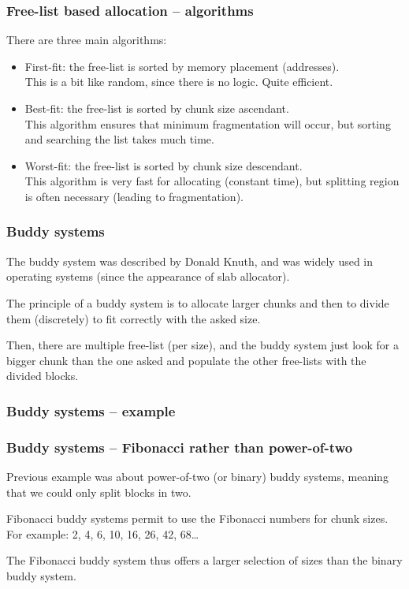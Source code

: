 \begin{frame}
  \frametitle{Free-list based allocation -- algorithms}

  There are three main algorithms:

  \begin{itemize}
  \item
    First-fit: the free-list is sorted by memory placement (addresses).\\
    This is a bit like random, since there is no logic. Quite efficient.
  \item
    Best-fit: the free-list is sorted by chunk size ascendant.\\
    This algorithm ensures that minimum fragmentation will occur, but
    sorting and searching the list takes much time.
  \item
    Worst-fit: the free-list is sorted by chunk size descendant.\\
    This algorithm is very fast for allocating (constant time), but
    splitting region is often necessary (leading to fragmentation).
  \end{itemize}

\end{frame}

\begin{frame}
  \frametitle{Buddy systems}

  The buddy system was described by Donald Knuth, and was widely used
  in operating systems (since the appearance of slab allocator).

  \-

  The principle of a buddy system is to allocate larger chunks and
  then to divide them (discretely) to fit correctly with the asked size.

  \-

  Then, there are multiple free-list (per size), and the buddy system
  just look for a bigger chunk than the one asked and populate the
  other free-lists with the divided blocks.

\end{frame}

\begin{frame}
  \frametitle{Buddy systems -- example}

  \begin{center}
  \end{center}

\end{frame}

\begin{frame}
  \frametitle{Buddy systems -- Fibonacci rather than power-of-two}

  Previous example was about power-of-two (or binary) buddy systems,
  meaning that we could only split blocks in two.

  \-

  Fibonacci buddy systems permit to use the Fibonacci numbers for
  chunk sizes. For example: 2, 4, 6, 10, 16, 26, 42, 68\ldots

  \-

  The Fibonacci buddy system thus offers a larger selection of sizes
  than the binary buddy system.

\end{frame}



